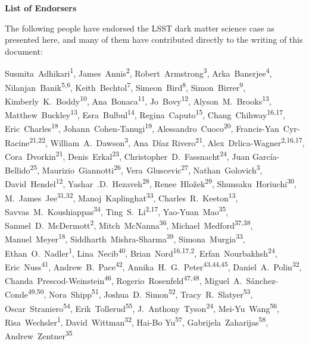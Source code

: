 
\begin{center}
  {\Large \bf List of Endorsers}
\end{center}
\bigskip

The following people have endorsed the LSST dark matter science case as presented here, and many of them have contributed directly to the writing of this document:

\def\altaffilmark#1{\textsuperscript{#1}}
\def\affil#1{\noindent #1 \\}

\normalsize
\begin{raggedright}

Susmita~Adhikari\altaffilmark{1},
James~Annis\altaffilmark{2},
Robert~Armstrong\altaffilmark{3},
Arka~Banerjee\altaffilmark{4},
Nilanjan~Banik\altaffilmark{5,6},
Keith~Bechtol\altaffilmark{7},
Simeon~Bird\altaffilmark{8},
Simon~Birrer\altaffilmark{9},
Kimberly~K.~Boddy\altaffilmark{10},
Ana~Bonaca\altaffilmark{11},
Jo~Bovy\altaffilmark{12},
Alyson~M.~Brooks\altaffilmark{13},
Matthew~Buckley\altaffilmark{13},
Esra~Bulbul\altaffilmark{14},
Regina~Caputo\altaffilmark{15},
Chang~Chihway\altaffilmark{16,17},
Eric~Charles\altaffilmark{18},
Johann~Cohen-Tanugi\altaffilmark{19},
Alessandro~Cuoco\altaffilmark{20},
Francis-Yan~Cyr-Racine\altaffilmark{21,22},
William~A.~Dawson\altaffilmark{3},
Ana~D\'{i}az Rivero\altaffilmark{21},
Alex~Drlica-Wagner\altaffilmark{2,16,17},
Cora~Dvorkin\altaffilmark{21},
Denis~Erkal\altaffilmark{23},
Christopher~D.~Fassnacht\altaffilmark{24},
Juan Garc\'ia-Bellido\altaffilmark{25},
Maurizio~Giannotti\altaffilmark{26},
Vera~Gluscevic\altaffilmark{27},
Nathan~Golovich\altaffilmark{3},
David~Hendel\altaffilmark{12},
Yashar~.D.~Hezaveh\altaffilmark{28},
Renee~Hlo\v{z}ek\altaffilmark{29},
Shunsaku~Horiuchi\altaffilmark{30},
M.~James~Jee\altaffilmark{31,32},
Manoj~Kaplinghat\altaffilmark{33},
Charles~R.~Keeton\altaffilmark{13},
Savvas~M.~Koushiappas\altaffilmark{34},
Ting~S.~Li\altaffilmark{2,17},
Yao-Yuan~Mao\altaffilmark{35},
Samuel~D.~McDermott\altaffilmark{2},
Mitch~McNanna\altaffilmark{36},
Michael~Medford\altaffilmark{37,38},
Manuel~Meyer\altaffilmark{18},
Siddharth~Mishra-Sharma\altaffilmark{39},
Simona~Murgia\altaffilmark{33},
Ethan~O.~Nadler\altaffilmark{1},
Lina~Necib\altaffilmark{40},
Brian~Nord\altaffilmark{16,17,2},
Erfan~Nourbakhsh\altaffilmark{24},
Eric~Nuss\altaffilmark{41},
Andrew~B.~Pace\altaffilmark{42},
Annika~H.~G.~Peter\altaffilmark{43,44,45},
Daniel~A.~Polin\altaffilmark{32},
Chanda~Prescod-Weinstein\altaffilmark{46},
Rogerio~Rosenfeld\altaffilmark{47,48},
Miguel~A.~S\'anchez-Conde\altaffilmark{49,50},
Nora~Shipp\altaffilmark{51},
Joshua~D.~Simon\altaffilmark{52},
Tracy~R.~Slatyer\altaffilmark{53},
Oscar~Straniero\altaffilmark{54},
Erik~Tollerud\altaffilmark{55},
J.~Anthony~Tyson\altaffilmark{24},
Mei-Yu~Wang\altaffilmark{56},
Risa~Wechsler\altaffilmark{1},
David~Wittman\altaffilmark{32},
Hai-Bo Yu\altaffilmark{57},
Gabrijela~Zaharijas\altaffilmark{58},
Andrew~Zentner\altaffilmark{35}


\end{raggedright}
